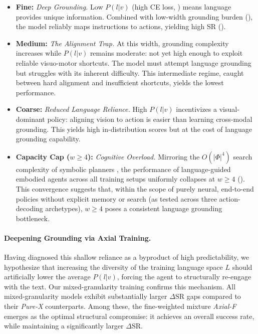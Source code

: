 \documentclass[11pt]{article}
\begin{document}
\begin{itemize}[leftmargin=*]
    \item \textbf{Fine:} \emph{Deep Grounding.} Low $P(l|v)$ (high CE loss, ) means language provides unique information. Combined with low-width grounding burden (), the model reliably maps instructions to actions, yielding high SR ().

    \item \textbf{Medium:} \emph{The Alignment Trap.} At this width, grounding complexity increases while $P(l|v)$ remains moderate: not yet high enough to exploit reliable visuo-motor shortcuts. The model must attempt language grounding but struggles with its inherent difficulty. This intermediate regime, caught between hard alignment and insufficient shortcuts, yields the lowest performance.

    \item \textbf{Coarse:} \emph{Reduced Language Reliance.} High $P(l|v)$ incentivizes a visual-dominant policy: aligning vision to action is easier than learning cross-modal grounding. This yields high in-distribution scores but at the cost of language grounding capability.

    \item \textbf{Capacity Cap ($w \ge 4$):} \emph{Cognitive Overload.} Mirroring the $O(|\Phi|^4)$ search complexity of symbolic planners \citep{DBLP:conf/aaai/LipovetzkyG17}, the performance of language-guided embodied agents across all training setups uniformly collapses at $w\ge4$ (). This convergence suggests that, within the scope of purely neural, end-to-end policies without explicit memory or search (as tested across three action-decoding archetypes), $w \ge 4$ poses a consistent language grounding bottleneck. 
\end{itemize}

\paragraph{Deepening Grounding via Axial Training.} 
Having diagnosed this shallow reliance as a byproduct of high predictability, we hypothesize that increasing the diversity of the training language space $L$ should artificially lower the average $P(l | v)$, forcing the agent to structurally re-engage with the text. Our mixed-granularity training confirms this mechanism. All mixed-granularity models exhibit substantially larger $\Delta\mathrm{SR}$ gaps compared to their \emph{Pure-X} counterparts. Among these, the fine-weighted mixture \emph{Axial-F} emerges as the optimal structural compromise: it achieves an overall success rate, while maintaining a significantly larger $\Delta\mathrm{SR}$.
\end{document}
